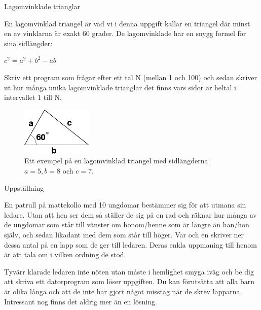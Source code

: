 \documentclass[10pt]{beamer}
\begin{document}
\begin{frame}{Lagomvinklade trianglar}

En lagomvinklad triangel är vad vi i denna uppgift kallar en triangel där minst en av vinklarna är exakt 60 grader. De lagomvinklade har en snygg formel för sina sidlängder:

${\displaystyle c^{2}=a^{2}+b^{2}-ab}$

Skriv ett program som frågar efter ett tal N (mellan 1 och 100) och sedan skriver ut hur många unika lagomvinklade trianglar det finns vars sidor är heltal i intervallet 1 till N.

\begin{figure}[!ht]
\centering
\includegraphics[width=0.3\textwidth]{triangel}
\caption{Ett exempel på en lagomvinklad triangel med sidlängderna $a = 5, b = 8$ och $c = 7$.}
\label{triangel}
\end{figure}
\end{frame}









\begin{frame}{Uppställning}

En patrull på mattekollo med 10 ungdomar bestämmer sig för att utmana sin ledare. Utan att hen ser dem så ställer de sig på en rad och räknar hur många av de ungdomar som står till vänster om honom/henne som är längre än han/hon själv, och sedan likadant med dem som står till höger. Var och en skriver ner dessa antal på en lapp som de ger till ledaren. Deras enkla uppmaning till henom är att tala om i vilken ordning de stod.

Tyvärr klarade ledaren inte nöten utan måste i hemlighet smyga iväg och be dig att skriva ett datorprogram som löser uppgiften. Du kan förutsätta att alla barn är olika långa och att de inte har gjort något misstag när de skrev lapparna. Intressant nog finns det aldrig mer än en lösning. 

\end{frame}
\end{document}
